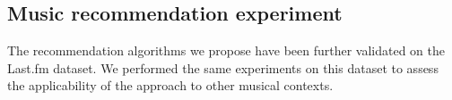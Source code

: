 \subsection{Music recommendation experiment}
The recommendation algorithms we propose have been further validated on the Last.fm dataset. We performed the same experiments on this dataset to assess the applicability of the approach to other musical contexts.
